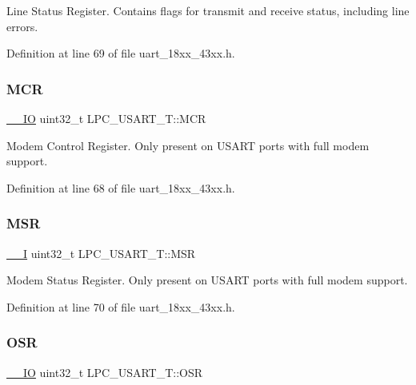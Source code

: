 Line Status Register. Contains flags for transmit and receive status, including line errors. 

Definition at line 69 of file uart\+\_\+18xx\+\_\+43xx.\+h.

\mbox{\label{struct_l_p_c___u_s_a_r_t___t_a3fca7faf2cc9ec38e5a8566538cadf48}} 
\subsubsection{\texorpdfstring{M\+CR}{MCR}}
{\footnotesize\ttfamily \hyperlink{core__sc300_8h_aec43007d9998a0a0e01faede4133d6be}{\+\_\+\+\_\+\+IO} uint32\+\_\+t L\+P\+C\+\_\+\+U\+S\+A\+R\+T\+\_\+\+T\+::\+M\+CR}

Modem Control Register. Only present on U\+S\+A\+RT ports with full modem support. 

Definition at line 68 of file uart\+\_\+18xx\+\_\+43xx.\+h.

\mbox{\label{struct_l_p_c___u_s_a_r_t___t_ac4372e0a659dc1f4b5503a8825ed1971}} 
\subsubsection{\texorpdfstring{M\+SR}{MSR}}
{\footnotesize\ttfamily \hyperlink{core__sc300_8h_af63697ed9952cc71e1225efe205f6cd3}{\+\_\+\+\_\+I} uint32\+\_\+t L\+P\+C\+\_\+\+U\+S\+A\+R\+T\+\_\+\+T\+::\+M\+SR}

Modem Status Register. Only present on U\+S\+A\+RT ports with full modem support. 

Definition at line 70 of file uart\+\_\+18xx\+\_\+43xx.\+h.

\mbox{\label{struct_l_p_c___u_s_a_r_t___t_abd99c522dd0ccec4b7c7b1c08cc3c1fb}} 
\subsubsection{\texorpdfstring{O\+SR}{OSR}}
{\footnotesize\ttfamily \hyperlink{core__sc300_8h_aec43007d9998a0a0e01faede4133d6be}{\+\_\+\+\_\+\+IO} uint32\+\_\+t L\+P\+C\+\_\+\+U\+S\+A\+R\+T\+\_\+\+T\+::\+O\+SR}

